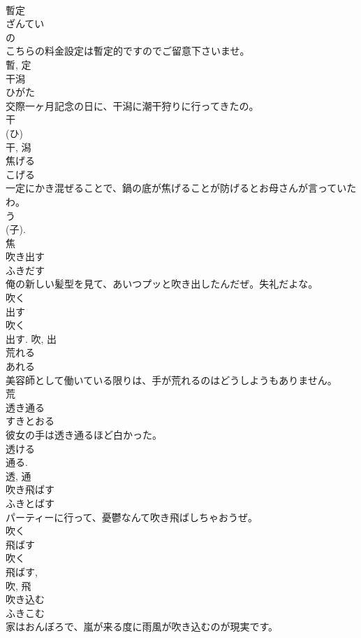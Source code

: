 \documentclass[8pt]{extreport}
\begin{document}
\begin{CJK}{UTF8}{min}
\\	暫定	
\\	ざんてい	
\\	の 
\\	こちらの料金設定は暫定的ですのでご留意下さいませ。	
\\	暫, 定	
\\	干潟	
\\	ひがた	
\\	交際一ヶ月記念の日に、干潟に潮干狩りに行ってきたの。	
\\	干 
\\	(ひ) 
\\	干, 潟	
\\	焦げる	
\\	こげる	
\\	一定にかき混ぜることで、鍋の底が焦げることが防げるとお母さんが言っていたわ。	
\\	う 
\\	(子). 
\\	焦	
\\	吹き出す	
\\	ふきだす	
\\	俺の新しい髪型を見て、あいつプッと吹き出したんだぜ。失礼だよな。	
\\	吹く 
\\	出す 
\\	吹く 
\\	出す.	吹, 出	
\\	荒れる	
\\	あれる	
\\	美容師として働いている限りは、手が荒れるのはどうしようもありません。	
\\	荒	
\\	透き通る	
\\	すきとおる	
\\	彼女の手は透き通るほど白かった。	
\\	透ける 
\\	通る. 
\\	透, 通	
\\	吹き飛ばす	
\\	ふきとばす	
\\	パーティーに行って、憂鬱なんて吹き飛ばしちゃおうぜ。	
\\	吹く 
\\	飛ばす 
\\	吹く 
\\	飛ばす, 
\\	吹, 飛	
\\	吹き込む	
\\	ふきこむ	
\\	家はおんぼろで、嵐が来る度に雨風が吹き込むのが現実です。	

\end{CJK}
\end{document}
